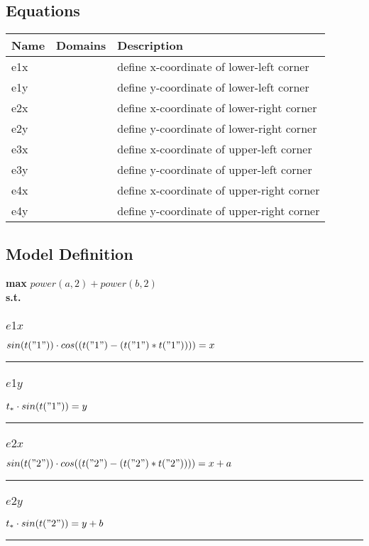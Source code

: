 \documentclass[11pt]{article}
\begin{document}
\subsection*{Equations}
\begin{tabularx}{\textwidth}{| l | l | X |}
\hline
\textbf{Name} & \textbf{Domains} & \textbf{Description}\\
\hline
\endhead

e1x &  & define x-coordinate of lower-left corner\\
e1y &  & define y-coordinate of lower-left corner\\
e2x &  & define x-coordinate of lower-right corner\\
e2y &  & define y-coordinate of lower-right corner\\
e3x &  & define x-coordinate of upper-left corner\\
e3y &  & define y-coordinate of upper-left corner\\
e4x &  & define x-coordinate of upper-right corner\\
e4y &  & define y-coordinate of upper-right corner\\
\hline
\end{tabularx}
\subsection*{Model Definition}
\textbf{max} $ power(a,2)  +  power(b,2) $\\
\textbf{s.t.}
\subsubsection*{$e1x$}
$
 sin(t("1"))  \cdot  cos((t("1") - (t("1") * t("1"))))  = x
$
\vspace{5pt}
\hrule
\subsubsection*{$e1y$}
$
t_{*} \cdot  sin(t("1"))  = y
$
\vspace{5pt}
\hrule
\subsubsection*{$e2x$}
$
 sin(t("2"))  \cdot  cos((t("2") - (t("2") * t("2"))))  = x + a
$
\vspace{5pt}
\hrule
\subsubsection*{$e2y$}
$
t_{*} \cdot  sin(t("2"))  = y + b
$
\vspace{5pt}
\hrule
\end{document}
